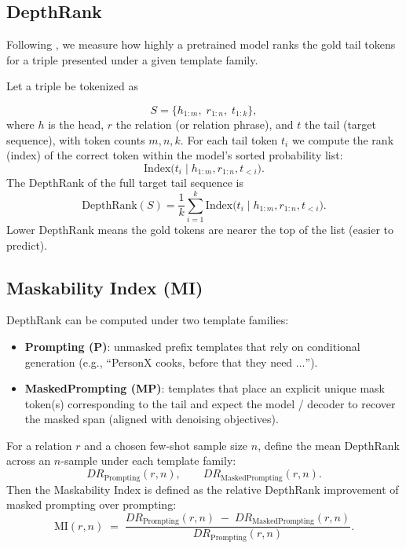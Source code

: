 \documentclass{i4c-en}
\begin{document}
\subsection{DepthRank} \label{sec:dr}
Following \cite{zhang2021alleviating}, we measure how highly a pretrained model ranks the gold tail tokens for a triple presented under a given template family.

Let a triple be tokenized as

\[
S = \{h_{1:m},\; r_{1:n},\; t_{1:k}\},
\]
where \(h\) is the head, \(r\) the relation (or relation phrase), and \(t\) the tail (target sequence), with token counts \(m,n,k\). For each tail token \(t_i\) we compute the rank (index) of the correct token within the model's sorted probability list:
\[
\mathrm{Index}\bigl(t_i \mid h_{1:m}, r_{1:n}, t_{<i}\bigr).
\]
The DepthRank of the full target tail sequence is
\[
\mathrm{DepthRank}(S) = \frac{1}{k}\sum_{i=1}^{k}\mathrm{Index}\bigl(t_i \mid h_{1:m}, r_{1:n}, t_{<i}\bigr).
\]
Lower DepthRank means the gold tokens are nearer the top of the list (easier to predict).





	\subsection{Maskability Index (MI)}
	DepthRank can be computed under two template families:
	
	\begin{itemize}
		\item \textbf{Prompting (P)}: unmasked prefix templates that rely on conditional generation (e.g., ``PersonX cooks, before that they need \(\dots\)'').
		\item \textbf{MaskedPrompting (MP)}: templates that place an explicit unique mask token(s) corresponding to the tail and expect the model / decoder to recover the masked span (aligned with denoising objectives).
	\end{itemize}
	
	For a relation \(r\) and a chosen few-shot sample size \(n\), define the mean DepthRank across an \(n\)-sample under each template family:
	\[
	DR_{\mathrm{Prompting}}(r,n), \qquad DR_{\mathrm{MaskedPrompting}}(r,n).
	\]
	Then the Maskability Index is defined as the relative DepthRank improvement of masked prompting over prompting:
	\begin{equation}\label{eq:mi}
		\mathrm{MI}(r,n) \;=\; \frac{DR_{\mathrm{Prompting}}(r,n) \;-\; DR_{\mathrm{MaskedPrompting}}(r,n)}{DR_{\mathrm{Prompting}}(r,n)}.
	\end{equation}
	
\end{document}

